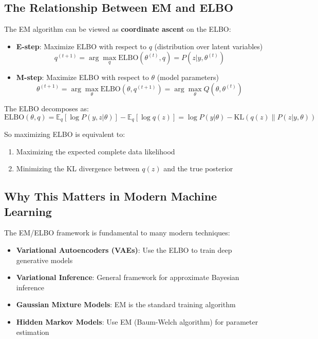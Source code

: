 \begin{notechapter}
\subsection{The Relationship Between EM and ELBO}

The EM algorithm can be viewed as \textbf{coordinate ascent} on the ELBO:

\begin{itemize}
    \item \textbf{E-step}: Maximize ELBO with respect to $q$ (distribution over latent variables)
    \[
    q^{(t+1)} = \arg\max_q \text{ELBO}(\theta^{(t)}, q) = P(z|y,\theta^{(t)})
    \]
    
    \item \textbf{M-step}: Maximize ELBO with respect to $\theta$ (model parameters)
    \[
    \theta^{(t+1)} = \arg\max_{\theta} \text{ELBO}(\theta, q^{(t+1)}) = \arg\max_{\theta} Q(\theta, \theta^{(t)})
    \]
\end{itemize}

The ELBO decomposes as:
\[
\text{ELBO}(\theta, q) = \mathbb{E}_q[\log P(y,z|\theta)] - \mathbb{E}_q[\log q(z)] = \log P(y|\theta) - \text{KL}(q(z) \| P(z|y,\theta))
\]

So maximizing ELBO is equivalent to:
\begin{enumerate}
    \item Maximizing the expected complete data likelihood
    \item Minimizing the KL divergence between $q(z)$ and the true posterior
\end{enumerate}

\subsection{Why This Matters in Modern Machine Learning}

The EM/ELBO framework is fundamental to many modern techniques:
\begin{itemize}
    \item \textbf{Variational Autoencoders (VAEs)}: Use the ELBO to train deep generative models
    \item \textbf{Variational Inference}: General framework for approximate Bayesian inference
    \item \textbf{Gaussian Mixture Models}: EM is the standard training algorithm
    \item \textbf{Hidden Markov Models}: Use EM (Baum-Welch algorithm) for parameter estimation
\end{itemize}


\end{notechapter}
